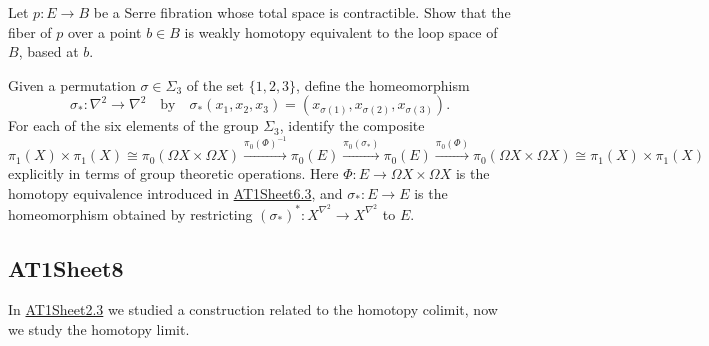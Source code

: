 \begin{sketch}
\end{sketch}

\label{exercise:AT1Sheet7.2}
Let $p : E\to B$ be a Serre fibration whose total space is contractible.
Show that the fiber of $p$ over a point $b\in B$ is weakly homotopy equivalent to the loop space of $B$, based at $b$.

\begin{sketch}
\end{sketch}

\label{exercise:AT1Sheet7.3}
Given a permutation $\sigma \in \Sigma_3$ of the set $\{1,2,3\}$, define the homeomorphism
\[
    \sigma_* : \nabla^2 \to \nabla^2 \quad\text{by}\quad \sigma_*(x_1,x_2,x_3) = (x_{\sigma(1)},x_{\sigma(2)},x_{\sigma(3)}).
\]
For each of the six elements of the group $\Sigma_3$, identify the composite
{\small
\[
    \pi_1(X) \times\pi_1(X)\!\cong\!\pi_0(\Omega X \times\Omega X) \xrightarrow{\pi_0(\Phi)^{-1}}
    \pi_0(E) \xrightarrow{\pi_0(\sigma_*)}
    \pi_0(E) \xrightarrow{\pi_0(\Phi)}
    \pi_0(\Omega X \times\Omega X)\!\cong\!\pi_1(X) \times\pi_1(X)
\]}
explicitly in terms of group theoretic operations. Here $\Phi : E \to\Omega X \times\Omega X$ is the homotopy
equivalence introduced in \hyperref[exercise:AT1Sheet6.3]{AT1Sheet6.3}, and $\sigma_* : E \to E$ is the homeomorphism obtained
by restricting $(\sigma_*)^* : X^{\nabla^2}
\to X^{\nabla^2}$ to $E$.

\begin{sketch}
\end{sketch}

\subsection{AT1Sheet8}

In \hyperref[exercise:AT1Sheet2.3]{AT1Sheet2.3} we studied a construction related to the homotopy colimit, now we study the homotopy limit.

